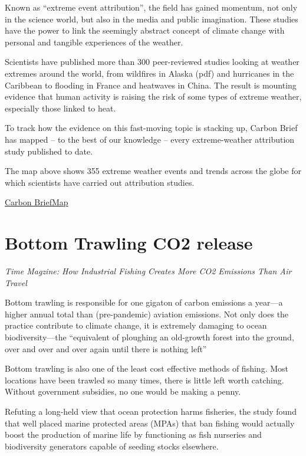 \documentclass[
]{book}
\begin{document}
Known as ``extreme event attribution'', the field has gained momentum, not only in the science world, but also in the media and public imagination. These studies have the power to link the seemingly abstract concept of climate change with personal and tangible experiences of the weather.

Scientists have published more than 300 peer-reviewed studies looking at weather extremes around the world, from wildfires in Alaska (pdf) and hurricanes in the Caribbean to flooding in France and heatwaves in China. The result is mounting evidence that human activity is raising the risk of some types of extreme weather, especially those linked to heat.

To track how the evidence on this fast-moving topic is stacking up, Carbon Brief has mapped -- to the best of our knowledge -- every extreme-weather attribution study published to date.

The map above shows 355 extreme weather events and trends across the globe for which scientists have carried out attribution studies.

\href{https://www.carbonbrief.org/mapped-how-climate-change-affects-extreme-weather-around-the-world}{Carbon BriefMap}

\hypertarget{bottom-trawling-co2-release}{%
\section{Bottom Trawling CO2 release}\label{bottom-trawling-co2-release}}

\emph{Time Magzine: How Industrial Fishing Creates More CO2 Emissions Than Air Travel}

Bottom trawling is responsible for one gigaton of carbon emissions a year---a higher annual total than (pre-pandemic) aviation emissions. Not only does the practice contribute to climate change, it is extremely damaging to ocean biodiversity---the ``equivalent of ploughing an old-growth forest into the ground, over and over and over again until there is nothing left''

Bottom trawling is also one of the least cost effective methods of fishing. Most locations have been trawled so many times, there is little left worth catching.
Without government subsidies, no one would be making a penny.

Refuting a long-held view that ocean protection harms fisheries, the study found that well placed marine protected areas (MPAs) that ban fishing would actually boost the production of marine life by functioning as fish nurseries and biodiversity generators capable of seeding stocks elsewhere.
\end{document}
